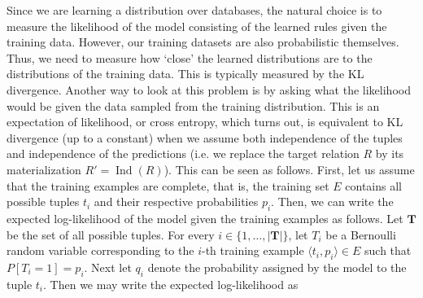 \documentclass[akbc,twoside,11pt]{article}
\newcounter{example}
\newcommand{\ondrej}[1]{\textcolor{red}{O: {#1}}}
\begin{document}


Since we are learning a distribution over databases, the natural choice is to measure the likelihood of the model consisting of the learned rules given the training data. However, our training datasets are also probabilistic themselves. Thus, we need to measure how `close' the learned distributions are to the distributions of the training data. This is typically measured by the KL divergence. Another way to look at this problem is by asking what the likelihood would be given the data sampled from the training distribution. This is an expectation of likelihood, or cross entropy, which turns out, is equivalent to KL divergence (up to a constant) when we assume both independence of the tuples and independence of the predictions (i.e. we replace the target relation $R$ by its materialization $R' = \operatorname{Ind}(R)$).
This can be seen as follows. First, let us assume that the training examples are complete, that is, the training set $E$ contains all possible tuples $t_i$ and their respective probabilities $p_i$. %
Then, we can write the expected log-likelihood of the model given the training examples as follows. Let $\mathbf{T}$ be the set of all possible tuples. For every $i \in \{1,\dots,|\mathbf{T}|\}$, let $T_i$ be a Bernoulli random variable corresponding to the $i$-th training example $\langle t_i, p_i \rangle \in E$ such that $P[T_i = 1] = p_i$. Next let $q_i$ denote the probability assigned by the model to the tuple $t_i$. Then we may write the expected log-likelihood as 
\end{document}
